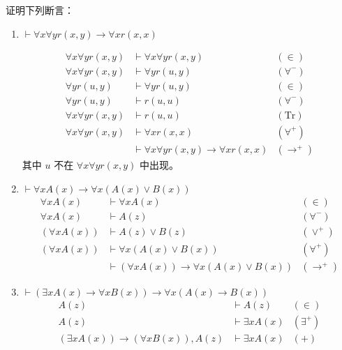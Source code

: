 \documentclass[UTF8]{ctexart}
\begin{document}
    \section{}
    证明下列断言：
    \begin{enumerate}
        \item $\vdash \forall x \forall y r(x, y) \to \forall x r(x, x)$ \par
        \begin{align*}
            \forall x \forall y r(x, y) & \vdash \forall x \forall y r(x, y) & (\in) \\
            \forall x \forall y r(x, y) & \vdash \forall y r(u, y) & (\forall^{-}) \\
            \forall y r(u, y) & \vdash \forall y r(u, y) & (\in) \\
            \forall y r(u, y) & \vdash r(u, u) & (\forall^{-}) \\
            \forall x \forall y r(x, y) & \vdash r(u, u) & (\mathrm{Tr}) \\
            \forall x \forall y r(x, y) & \vdash \forall x r(x, x) & (\forall^{+}) \\
            & \vdash \forall x \forall y r(x, y) \to \forall x r(x, x) & (\to^{+})
        \end{align*}
        其中 $u$ 不在 $\forall x \forall y r(x, y)$ 中出现。
        \item $\vdash \forall x A(x) \to \forall x(A(x) \lor B(x))$
        \begin{align*}
            \forall x A(x) & \vdash \forall x A(x) & (\in) \\
            \forall x A(x) & \vdash A(z) & (\forall^{-}) \\
            (\forall x A(x)) & \vdash A(z) \lor B(z) & (\lor^{+}) \\
            (\forall x A(x)) & \vdash \forall x (A(x) \lor B(x)) & (\forall^{+}) \\
            & \vdash (\forall x A(x)) \to \forall x (A(x) \lor B(x)) & (\to^{+})
        \end{align*}
        \item $\vdash (\exists x A(x) \to \forall x B(x)) \to \forall x (A(x) \to B(x))$
        \begin{align*}
            A(z) & \vdash A(z) & (\in) \\
            A(z) & \vdash \exists x A(x) & (\exists^{+}) \\
            (\exists x A(x)) \to (\forall x B(x)), A(z) & \vdash \exists x A(x) & (+) \\

\end{align*}
\end{enumerate}
\end{document}
